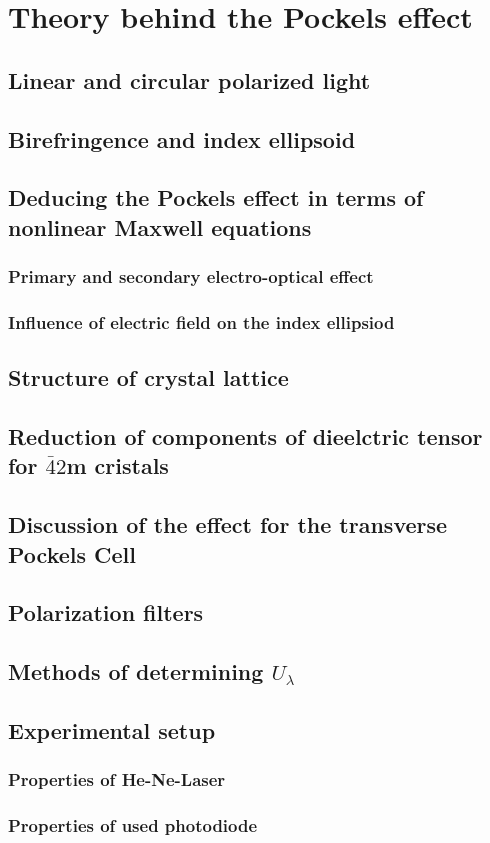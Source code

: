 \section{Theory behind the Pockels effect}

\subsection{Linear and circular polarized light}

\subsection{Birefringence and index ellipsoid}

\subsection{Deducing the Pockels effect in terms of nonlinear Maxwell equations}
\subsubsection{Primary and secondary electro-optical effect}
\subsubsection{Influence of electric field on the index ellipsiod}

\subsection{Structure of crystal lattice}

\subsection{Reduction of components of dieelctric tensor for $\bar{4}2$m cristals}

\subsection{Discussion of the effect for the transverse Pockels Cell}

\subsection{Polarization filters}

\subsection{Methods of determining $U_\lambda$}

\subsection{Experimental setup}
\subsubsection{Properties of He-Ne-Laser}
\subsubsection{Properties of used photodiode}
